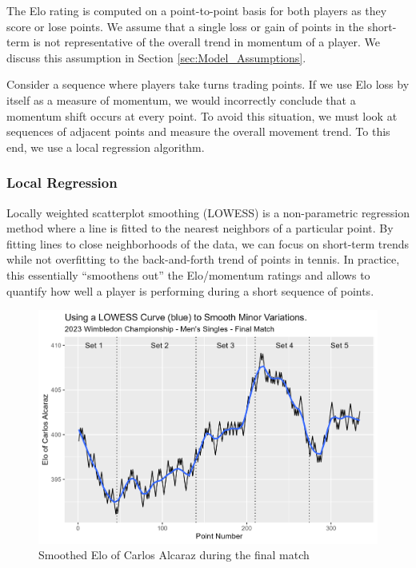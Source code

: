 \documentclass[letterpaper, 12pt]{article}
\begin{document}
            The Elo rating is computed on a point-to-point basis for both players as they score or lose points. We assume that a single loss or gain of points in the short-term is not representative of the overall trend in momentum of a player. We discuss this assumption in Section \ref{sec:Model_Assumptions}. 
            
            Consider a sequence where players take turns trading points. If we use Elo loss by itself as a measure of momentum, we would incorrectly conclude that a momentum shift occurs at every point. To avoid this situation, we must look at sequences of adjacent points and measure the overall movement trend. To this end, we use a local regression algorithm. 

            \subsubsection{Local Regression}
            Locally weighted scatterplot smoothing (LOWESS) is a non-parametric regression method where a line is fitted to the nearest neighbors of a particular point. By fitting lines to close neighborhoods of the data, we can focus on short-term trends while not overfitting to the back-and-forth trend of points in tennis. In practice, this essentially ``smoothens out'' the Elo/momentum ratings and allows to quantify how well a player is performing during a short sequence of points.
            
            \begin{figure}[H]
                \centering
                \includegraphics[keepaspectratio, width = \textwidth]{Figures/Final_Smoothed_Diff.png}
                \caption{Smoothed Elo of Carlos Alcaraz during the final match}
                \label{fig:smooth_Elo}
            \end{figure}
\end{document}
